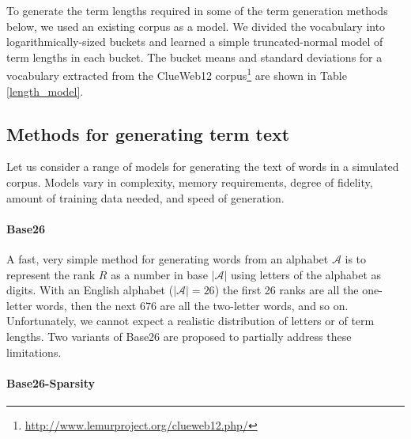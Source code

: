 \documentclass[11pt]{report}
\begin{document}
To generate the term lengths required in some of the term generation
methods below, we used an existing corpus as a model. 
We divided the vocabulary into logarithmically-sized buckets 
and learned a simple truncated-normal model of term lengths in each bucket.
The bucket means and standard deviations for a vocabulary extracted
from the ClueWeb12 
corpus\footnote{\url{http://www.lemurproject.org/clueweb12.php/}} are 
shown in Table \ref{length_model}.

\subsection{Methods for generating term text}

Let us consider a range of models for generating the text of words in
a simulated corpus.   Models vary in complexity, memory requirements,
degree of fidelity, amount of training data needed, and speed of generation.

\paragraph*{Base26}

A fast, very simple method for generating words from an alphabet
$\mathcal{A}$ is to represent the rank $R$ as a number in base
$|\mathcal{A}|$ using letters of the alphabet as digits. With an
English alphabet ($|\mathcal{A}|=26$) the first 26 ranks are all the
one-letter words, then the next 676 are all the two-letter words, and
so on.  Unfortunately, we cannot expect a realistic distribution of
letters or of term lengths.  Two variants of Base26 are proposed to
partially address these limitations.

\paragraph*{Base26-Sparsity}
\end{document}

